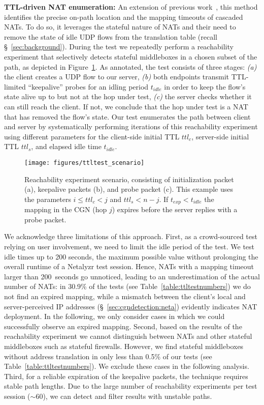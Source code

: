 \documentclass[10pt]{sig-alternate-05-2015}
\newcommand\xref[1]{\S~\ref{#1}}
\newcommand{\neta}{Netalyzr\xspace}
\newcommand{\parax}[1]{\vspace{0.2em} \noindent \textbf{#1:}}
\begin{document}
\parax{TTL-driven NAT enumeration} An extension of previous
work~\cite{muller2013analysis}, this method identifies the precise
on-path location and the mapping timeouts of cascaded NATs. To do so,
it leverages the stateful nature of NATs and their need to remove the
state of idle UDP flows from the translation table (recall
\xref{sec:background}).
During the test we repeatedly perform a reachability experiment that 
selectively detects stateful middleboxes in a chosen subset of the 
path, as depicted in Figure~\ref{fig:ttltestscenario}. As annotated, the test 
consists of three stages:
\textit{(a)} the client creates a UDP flow to our server,
\textit{(b)} both endpoints transmit TTL-limited ``keepalive'' probes
for an idling period $t_{idle}$ in order to keep the flow's state
alive up to but not at the hop under test,
\textit{(c)} the server checks whether it can still reach the client.
If not, we conclude that the hop under test is a NAT that has removed
the flow's state.
Our test enumerates the 
path between client and server by systematically performing iterations of this 
reachability experiment using different parameters for the client-side initial 
TTL $ttl_c$, server-side initial TTL $ttl_s$, and elapsed idle time $t_{idle}$.

\begin{figure}
  \begin{center}
    \texttt{[image: figures/ttltest\_scenario]}
  \caption{Reachability experiment scenario, consisting of 
  initialization packet (a), keepalive packets (b), and probe packet (c). 
  This example uses the parameters $i \leq ttl_c < j$ and $ttl_s < n-j$.
  If $t_{exp} < t_{idle}$ the mapping in the CGN (hop $j$) expires 
  before the server replies with a probe packet.}
    \label{fig:ttltestscenario}
  \end{center}
\end{figure}

We acknowledge three limitations of this approach. First, as a
crowd-sourced test relying on user involvement, we need to limit the
idle period of the test. We test idle times up to 200 
seconds, the maximum possible value without prolonging the overall 
runtime of a \neta test session. Hence, NATs with a mapping timeout larger than 
200~seconds go unnoticed, leading to an 
underestimation of the actual number of NATs: in 
30.9\%{} of the tests (see Table~\ref{table:ttltestnumbers}) 
we do not find an expired 
mapping, while a mismatch between the client's local and server-perceived IP addresses
(\xref{sec:cgndetection:neta}) evidently indicates NAT deployment.
In the 
following, we only consider cases in which we could successfully observe an 
expired mapping.
Second, based on the results of the reachability experiment we cannot distinguish 
between NATs and other stateful middleboxes such as stateful firewalls. 
However, we find stateful middleboxes without address translation 
in only less than 0.5\%{} of our tests (see 
Table~\ref{table:ttltestnumbers}). We 
exclude these cases in the following analysis.
Third, for a reliable expiration of the keepalive packets, the technique 
requires stable path lengths. Due to the large number of reachability 
experiments per test session ($\sim$60), we can detect and filter results with 
unstable paths.
\end{document}
